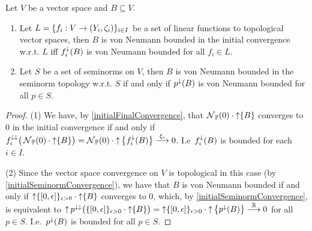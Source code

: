 \begin{proposition} \label{vonNeumannBoundednessInitialSpace}
Let $V$ be a vector space and $B\subseteq V$.
\begin{enumerate}
\item Let $L = \{f_i:V\to \sSet{Y_i,\zeta_i}\}_{i\in I}$ be a set of linear functions to topological vector spaces, then $B$ is von Neumann bounded in the initial convergence w.r.t. $L$ iff $f_i^\downarrow(B)$ is von Neumann bounded for all $f_i\in L$.
\item Let $S$ be a set of seminorms on $V$, then $B$ is von Neumann bounded in the seminorm topology w.r.t. $S$ \textup{if and only if} $p^\downarrow(B)$ is von Neumann bounded for all $p\in S$.
\end{enumerate}
\end{proposition}
\begin{proof}
(1) We have, by \ref{initialFinalConvergence}, that $\operatorname{\mathcal{N}}_{\mathbb{F}}(0)\cdot\operatorname{\uparrow} \{B\}$ converges to $0$ in the initial convergence if and only if $f_i^{\downarrow\downarrow}\big(\operatorname{\mathcal{N}}_{\mathbb{F}}(0)\cdot\operatorname{\uparrow} \{B\}\big) = \operatorname{\mathcal{N}}_{\mathbb{F}}(0)\cdot\operatorname{\uparrow} \big\{f_i^{\downarrow}(B)\big\} \overset{\xi_i}{\longrightarrow} 0$. I.e\ $f_i^\downarrow(B)$ is bounded for each $i\in I$.

(2) Since the vector space convergence on $V$ is topological in this case (by \ref{initialSeminormConvergence}), we have that $B$ is von Neumann bounded if and only if $\upset \{\interval{0,\epsilon}\}_{\epsilon > 0}\cdot\upset\{B\}$ converges to $0$, which, by \ref{initialSeminormConvergence}, is equivalent to $\upset p^{\imf\imf}\big(\{\interval{0,\epsilon}\}_{\epsilon > 0}\cdot\upset\{B\}\big) = \upset \{\interval{0,\epsilon}\}_{\epsilon > 0}\cdot\upset\big\{p^{\imf}(B)\big\} \overset{\R}{\longrightarrow} 0$ for all $p\in S$. I.e.\ $p^{\downarrow}(B)$ is bounded for all $p\in S$.
\end{proof}

